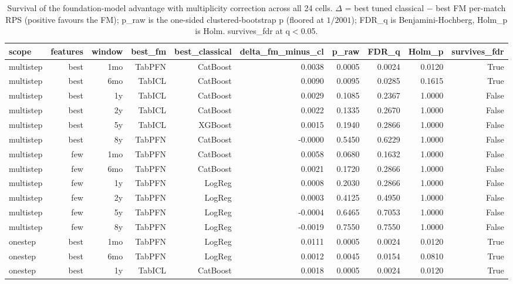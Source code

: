 \begin{table}[t]
  \centering
  \caption{Survival of the foundation-model advantage with multiplicity correction across all 24 cells. $\Delta$ = best tuned classical $-$ best FM per-match RPS (positive favours the FM); p\_raw is the one-sided clustered-bootstrap p (floored at $1/2001$); FDR\_q is Benjamini-Hochberg, Holm\_p is Holm. survives\_fdr at q$<$0.05.}
  \label{tab:ablation_survival}
  \begin{tabular}{lrrrrrrrrr}
  \toprule
  scope & features & window & best\_fm & best\_classical & delta\_fm\_minus\_cl & p\_raw & FDR\_q & Holm\_p & survives\_fdr \\
  \midrule
  multistep & best & 1mo & TabPFN & CatBoost & 0.0038 & 0.0005 & 0.0024 & 0.0120 & True \\
  multistep & best & 6mo & TabICL & CatBoost & 0.0090 & 0.0095 & 0.0285 & 0.1615 & True \\
  multistep & best & 1y & TabICL & CatBoost & 0.0029 & 0.1085 & 0.2367 & 1.0000 & False \\
  multistep & best & 2y & TabICL & CatBoost & 0.0022 & 0.1335 & 0.2670 & 1.0000 & False \\
  multistep & best & 5y & TabICL & XGBoost & 0.0015 & 0.1940 & 0.2866 & 1.0000 & False \\
  multistep & best & 8y & TabPFN & CatBoost & -0.0000 & 0.5450 & 0.6229 & 1.0000 & False \\
  multistep & few & 1mo & TabPFN & CatBoost & 0.0058 & 0.0680 & 0.1632 & 1.0000 & False \\
  multistep & few & 6mo & TabPFN & CatBoost & 0.0021 & 0.1720 & 0.2866 & 1.0000 & False \\
  multistep & few & 1y & TabPFN & LogReg & 0.0008 & 0.2030 & 0.2866 & 1.0000 & False \\
  multistep & few & 2y & TabPFN & LogReg & 0.0003 & 0.4125 & 0.4950 & 1.0000 & False \\
  multistep & few & 5y & TabPFN & LogReg & -0.0004 & 0.6465 & 0.7053 & 1.0000 & False \\
  multistep & few & 8y & TabPFN & LogReg & -0.0019 & 0.7550 & 0.7550 & 1.0000 & False \\
  onestep & best & 1mo & TabPFN & LogReg & 0.0111 & 0.0005 & 0.0024 & 0.0120 & True \\
  onestep & best & 6mo & TabPFN & LogReg & 0.0012 & 0.0045 & 0.0154 & 0.0810 & True \\
  onestep & best & 1y & TabICL & CatBoost & 0.0018 & 0.0005 & 0.0024 & 0.0120 & True \\

\end{tabular}
\end{table}
